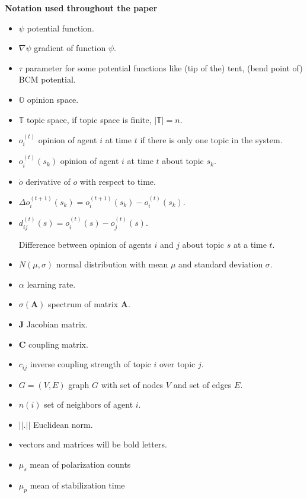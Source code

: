 \usepackage{todonotes}
\usepackage{cite}
\usepackage{verbatim}
\usepackage{bm}

\DeclareMathOperator*{\argmax}{arg\,max}
\usepackage[margin=1in]{geometry}










\begin{tcolorbox}
\begin{center}
\textbf{Notation used throughout the paper}
\end{center}
\begin{multicols}{2}
[
]
\begin{itemize}
\item $\psi$ potential function.
\item $\nabla \psi$ gradient of function $\psi$.
\item $\tau$ parameter for some potential functions like (tip of the) tent, (bend point of) BCM potential.
\item $\mathbb{O}$ opinion space.
\item $\mathbb{T}$ topic space, if topic space is finite, $|\mathbb{T}| = n$.
\item $o_i^{(t)}$ opinion of agent $i$ at time $t$ if there is only one topic in the system.
\item $o_i^{(t)}(s_k)$ opinion of agent $i$ at time $t$ about topic $s_k$.
\item $\dot{o}$ derivative of $o$ with respect to time.
\item $\Delta o_i^{(t+1)}(s_k) = o_i^{(t+1)}(s_k) - o_i^{(t)}(s_k) $.
\item  $d_{ij}^{(t)}(s) = o_i^{(t)}(s) - o_j^{(t)}(s)$. 
  
Difference between opinion of agents $i$ and $j$ about topic $s$ at a time $t$.
\columnbreak
\item $N(\mu, \sigma)$ normal distribution with mean $\mu$ and standard deviation $\sigma$.
\item $\alpha$ learning rate.
\item $\sigma(\mathbf{A})$ spectrum of matrix $\mathbf{A}$.
\item $\mathbf{J}$ Jacobian matrix.
\item $\mathbf{C}$ coupling matrix.
\item $c_{ij}$ inverse coupling strength of topic $i$ over topic $j$.
\item $G = (V,E)$ graph $G$ with set of nodes $V$ and set of edges $E$.
\item $n(i)$ set of neighbors of agent $i$.
\item $||.||$ Euclidean norm.
\item vectors and matrices will be bold letters.
\item $\mu_s$ mean of polarization counts
\item $\mu_p$ mean of stabilization time
\end{itemize}
\end{multicols}
\end{tcolorbox}
